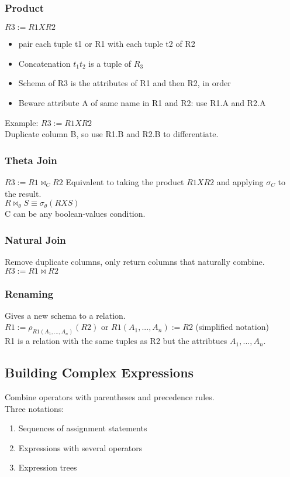 \documentclass[12pt]{article}
\begin{document}
\subsubsection{Product}
$R3 := R1 X R2$
\begin{itemize}
    \item{pair each tuple t1 or R1 with each tuple t2 of R2}
    \item{Concatenation $t_1 t_2$ is a tuple of $R_3$}
    \item{Schema of R3 is the attributes of R1 and then R2, in order}
    \item{Beware attribute A of same name in R1 and R2: use R1.A and R2.A}
\end{itemize}
Example: $R3 := R1 X R2$\\
Duplicate column B, so use R1.B and R2.B to differentiate.

\subsubsection{Theta Join}
$R3 := R1 \Join_C R2$
Equivalent to taking the product $R1 X R2$ and applying $\sigma_C$ to the
result.\\
$R \Join_{\theta} S \equiv \sigma_{\theta}(R X S)$\\
C can be any boolean-values condition.

\subsubsection{Natural Join}
Remove duplicate columns, only return columns that naturally combine.
$R3 := R1 \Join R2$

\subsubsection{Renaming}
Gives a new schema to a relation.\\
$R1:= \rho_{R1(A_1,...,A_n)}(R2)$ or $R1(A_1,...,A_n) := R2$ (simplified
notation)\\
R1 is a relation with the same tuples as R2 but the attribtues $A_1,...,A_n$.

\subsection{Building Complex Expressions}
Combine operators with parentheses and precedence rules.\\
Three notations:\\
\begin{enumerate}
    \item{Sequences of assignment statements}
    \item{Expressions with several operators}
    \item{Expression trees}
\end{enumerate}
\end{document}
